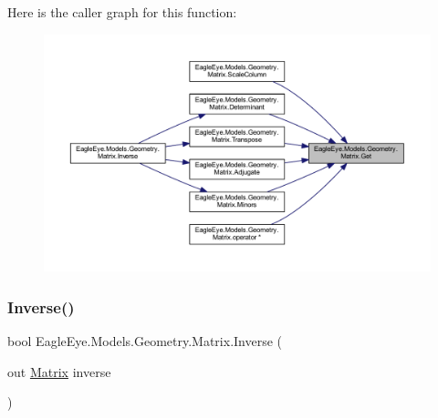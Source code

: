 Here is the caller graph for this function\+:\nopagebreak
\begin{figure}[H]
\begin{center}
\leavevmode
\includegraphics[width=350pt]{class_eagle_eye_1_1_models_1_1_geometry_1_1_matrix_a1b13104b3b70f8886591bffea10d87e5_icgraph}
\end{center}
\end{figure}
\mbox{\label{class_eagle_eye_1_1_models_1_1_geometry_1_1_matrix_a6d951dec401cc5239e3fa57dbae720a2}} 
\subsubsection{\texorpdfstring{Inverse()}{Inverse()}}
{\footnotesize\ttfamily bool Eagle\+Eye.\+Models.\+Geometry.\+Matrix.\+Inverse (\begin{DoxyParamCaption}\item[{out \mbox{\hyperlink{class_eagle_eye_1_1_models_1_1_geometry_1_1_matrix}{Matrix}}}]{inverse }\end{DoxyParamCaption})}

